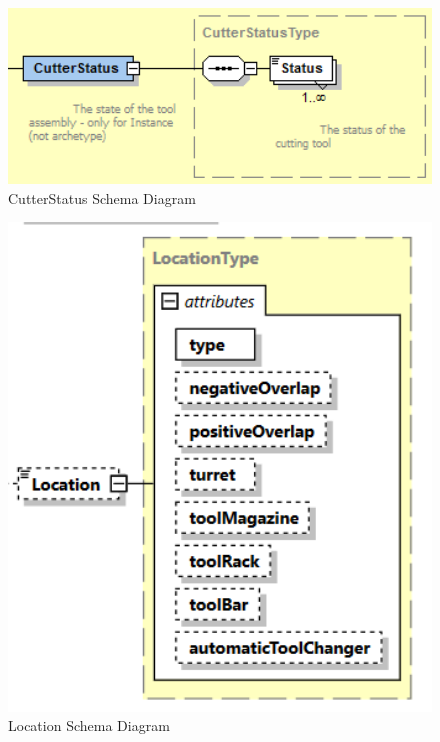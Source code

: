 \FloatBarrier


\begin{figure}[ht]
  \centering
    \includegraphics[width=1.0\textwidth]{figures/CutterStatus Schema.png}
  \caption{CutterStatus Schema Diagram}
  \label{fig:CutterStatus Schema Diagram}
\end{figure}

\FloatBarrier


\begin{figure}[ht]
  \centering
    \includegraphics[width=1.0\textwidth]{figures/Location Schema.png}
  \caption{Location Schema Diagram}
  \label{fig:Location Schema Diagram}
\end{figure}

